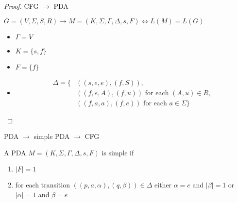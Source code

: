 \begin{proof}
    CFG $\to$ PDA

    $G=(V,\Sigma, S,R)\to M=(K,\Sigma, \Gamma, \Delta, s, F) \iff L(M)=L(G)$
    \begin{itemize}
        \item $\Gamma=V$
        \item $K=\{ s,f \}$
        \item $F=\{ f \}$
        \item 
        \begin{align*}
            \Delta=\{ &((s,e,e),(f,S)),\\
            &((f,e,A),(f,u))\text{ for each }(A,u)\in R,\\
            &((f,a,a),(f,e))\text{ for each } a\in\Sigma\}
        \end{align*}
    \end{itemize}
\end{proof}

PDA $\to$ simple PDA $\to$ CFG 

\begin{definition}
    A PDA $M=(K,\Sigma, \Gamma, \Delta, s,F)$ is simple if 
    \begin{enumerate}
        \item $|F|=1$
        \item for each transition $((p,a,\alpha),(q,\beta))\in\Delta$ 
        \subitem either $\alpha=e$ and $|\beta|=1$ 
        \subitem or $|\alpha|=1$ and $\beta=e$
    \end{enumerate}
\end{definition}

